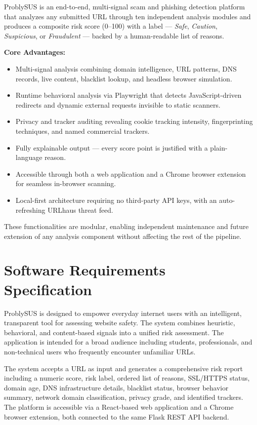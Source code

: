 ProblySUS is an end-to-end, multi-signal scam and phishing detection platform that analyzes any submitted URL through ten independent analysis modules and produces a composite risk score (0–100) with a label — \textit{Safe}, \textit{Caution}, \textit{Suspicious}, or \textit{Fraudulent} — backed by a human-readable list of reasons.

\textbf{Core Advantages:}

\begin{itemize}
\item Multi-signal analysis combining domain intelligence, URL patterns, DNS records, live content, blacklist lookup, and headless browser simulation.
\item Runtime behavioral analysis via Playwright that detects JavaScript-driven redirects and dynamic external requests invisible to static scanners.
\item Privacy and tracker auditing revealing cookie tracking intensity, fingerprinting techniques, and named commercial trackers.
\item Fully explainable output — every score point is justified with a plain-language reason.
\item Accessible through both a web application and a Chrome browser extension for seamless in-browser scanning.
\item Local-first architecture requiring no third-party API keys, with an auto-refreshing URLhaus threat feed.
\end{itemize}

These functionalities are modular, enabling independent maintenance and future extension of any analysis component without affecting the rest of the pipeline.

\section{Software Requirements Specification}

ProblySUS is designed to empower everyday internet users with an intelligent, transparent tool for assessing website safety. The system combines heuristic, behavioral, and content-based signals into a unified risk assessment. The application is intended for a broad audience including students, professionals, and non-technical users who frequently encounter unfamiliar URLs.

The system accepts a URL as input and generates a comprehensive risk report including a numeric score, risk label, ordered list of reasons, SSL/HTTPS status, domain age, DNS infrastructure details, blacklist status, browser behavior summary, network domain classification, privacy grade, and identified trackers. The platform is accessible via a React-based web application and a Chrome browser extension, both connected to the same Flask REST API backend.

